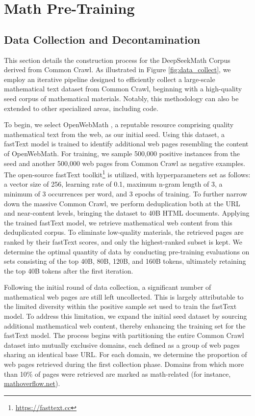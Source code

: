 \section{Math Pre-Training}

\subsection{Data Collection and Decontamination} This section details the construction process for the DeepSeekMath Corpus derived from Common Crawl. As illustrated in Figure \ref{fig:data_collect}, we employ an iterative pipeline designed to efficiently collect a large-scale mathematical text dataset from Common Crawl, beginning with a high-quality seed corpus of mathematical materials. Notably, this methodology can also be extended to other specialized areas, including code.

To begin, we select OpenWebMath \citep{openwebmath}, a reputable resource comprising quality mathematical text from the web, as our initial seed. Using this dataset, a fastText model \citep{joulin2016fasttext} is trained to identify additional web pages resembling the content of OpenWebMath. For training, we sample 500,000 positive instances from the seed and another 500,000 web pages from Common Crawl as negative examples. The open-source fastText toolkit\footnote{\url{https://fasttext.cc}} is utilized, with hyperparameters set as follows: a vector size of 256, learning rate of 0.1, maximum n-gram length of 3, a minimum of 3 occurrences per word, and 3 epochs of training. To further narrow down the massive Common Crawl, we perform deduplication both at the URL and near-content levels, bringing the dataset to 40B HTML documents. Applying the trained fastText model, we retrieve mathematical web content from this deduplicated corpus. To eliminate low-quality materials, the retrieved pages are ranked by their fastText scores, and only the highest-ranked subset is kept. We determine the optimal quantity of data by conducting pre-training evaluations on sets consisting of the top 40B, 80B, 120B, and 160B tokens, ultimately retaining the top 40B tokens after the first iteration.

Following the initial round of data collection, a significant number of mathematical web pages are still left uncollected. This is largely attributable to the limited diversity within the positive sample set used to train the fastText model. To address this limitation, we expand the initial seed dataset by sourcing additional mathematical web content, thereby enhancing the training set for the fastText model. The process begins with partitioning the entire Common Crawl dataset into mutually exclusive domains, each defined as a group of web pages sharing an identical base URL. For each domain, we determine the proportion of web pages retrieved during the first collection phase. Domains from which more than 10\% of pages were retrieved are marked as math-related (for instance, \url{mathoverflow.net}). 


